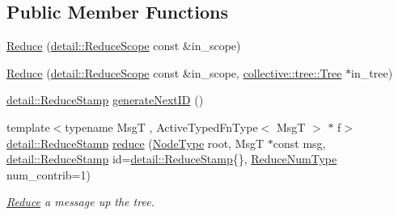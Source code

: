 \subsection*{Public Member Functions}
\begin{DoxyCompactItemize}
\item 
\hyperlink{structvt_1_1collective_1_1reduce_1_1_reduce_a5e5a3c0e00259bec5aad517aeaba36ac}{Reduce} (\hyperlink{structvt_1_1collective_1_1reduce_1_1detail_1_1_reduce_scope}{detail\+::\+Reduce\+Scope} const \&in\+\_\+scope)
\item 
\hyperlink{structvt_1_1collective_1_1reduce_1_1_reduce_a346fd6b262828a501c342330fc091fec}{Reduce} (\hyperlink{structvt_1_1collective_1_1reduce_1_1detail_1_1_reduce_scope}{detail\+::\+Reduce\+Scope} const \&in\+\_\+scope, \hyperlink{structvt_1_1collective_1_1tree_1_1_tree}{collective\+::tree\+::\+Tree} $\ast$in\+\_\+tree)
\item 
\hyperlink{namespacevt_1_1collective_1_1reduce_1_1detail_aacc1fcd729d934ba143fee3a943bf9e7}{detail\+::\+Reduce\+Stamp} \hyperlink{structvt_1_1collective_1_1reduce_1_1_reduce_ac279b15e3bb5754d03307e2fe23ec734}{generate\+Next\+ID} ()
\item 
{\footnotesize template$<$typename MsgT , Active\+Typed\+Fn\+Type$<$ Msg\+T $>$ $\ast$ f$>$ }\\\hyperlink{namespacevt_1_1collective_1_1reduce_1_1detail_aacc1fcd729d934ba143fee3a943bf9e7}{detail\+::\+Reduce\+Stamp} \hyperlink{structvt_1_1collective_1_1reduce_1_1_reduce_ac41b433147b957df5639d72ac8946090}{reduce} (\hyperlink{namespacevt_a866da9d0efc19c0a1ce79e9e492f47e2}{Node\+Type} root, MsgT $\ast$const msg, \hyperlink{namespacevt_1_1collective_1_1reduce_1_1detail_aacc1fcd729d934ba143fee3a943bf9e7}{detail\+::\+Reduce\+Stamp} id=\hyperlink{namespacevt_1_1collective_1_1reduce_1_1detail_aacc1fcd729d934ba143fee3a943bf9e7}{detail\+::\+Reduce\+Stamp}\{\}, \hyperlink{structvt_1_1collective_1_1reduce_1_1_reduce_a6c3e63aca10c31d2823b0b18cf9762a4}{Reduce\+Num\+Type} num\+\_\+contrib=1)
\begin{DoxyCompactList}\small\item\em \hyperlink{structvt_1_1collective_1_1reduce_1_1_reduce}{Reduce} a message up the tree. \end{DoxyCompactList}\item 

\end{DoxyCompactItemize}
